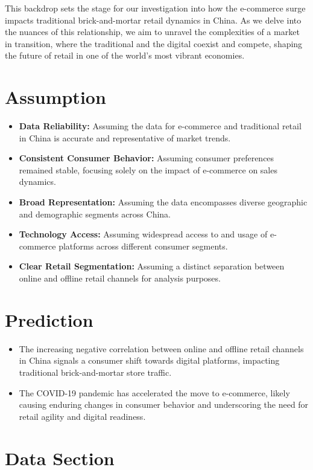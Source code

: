\documentclass{article}
\begin{document}
This backdrop sets the stage for our investigation into how the e-commerce surge impacts traditional brick-and-mortar retail dynamics in China. As we delve into the nuances of this relationship, we aim to unravel the complexities of a market in transition, where the traditional and the digital coexist and compete, shaping the future of retail in one of the world's most vibrant economies.
\section{Assumption}

\begin{itemize}
    \item \textbf{Data Reliability:} Assuming the data for e-commerce and traditional retail in China is accurate and representative of market trends.
    \item \textbf{Consistent Consumer Behavior:} Assuming consumer preferences remained stable, focusing solely on the impact of e-commerce on sales dynamics.
    \item \textbf{Broad Representation:} Assuming the data encompasses diverse geographic and demographic segments across China.
    \item \textbf{Technology Access:} Assuming widespread access to and usage of e-commerce platforms across different consumer segments.
    \item \textbf{Clear Retail Segmentation:} Assuming a distinct separation between online and offline retail channels for analysis purposes.
\end{itemize}

\section{Prediction}
\begin{itemize}
    \item The increasing negative correlation between online and offline retail channels in China signals a consumer shift towards digital platforms, impacting traditional brick-and-mortar store traffic.
    \item The COVID-19 pandemic has accelerated the move to e-commerce, likely causing enduring changes in consumer behavior and underscoring the need for retail agility and digital readiness.
\end{itemize}

\section{Data Section}
\end{document}
